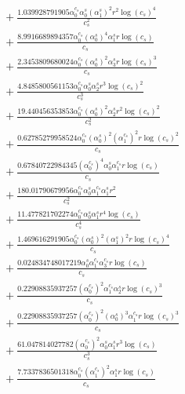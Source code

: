 \documentclass[10pt]{article}
\begin{document}
\begin{align*}
&{}  + \frac{1.039928791905 \alpha_{0}^{c_s} \alpha_{0}^s \left(\alpha_{1}^s\right)^{2} r^{2} \log{\left(c_{s} \right)}^{4}}{c_{s}^{2}} \\
&{}  + \frac{8.9916689894357 \alpha_{0}^{c_s} \left(\alpha_{0}^s\right)^{4} \alpha_{1}^s r \log{\left(c_{s} \right)}}{c_{s}} \\
&{}  + \frac{2.3453809680024 \alpha_{0}^{c_s} \left(\alpha_{0}^s\right)^{2} \alpha_{3}^s r \log{\left(c_{s} \right)}^{3}}{c_{s}} \\
&{}  + \frac{4.8485800561153 \alpha_{0}^{c_s} \alpha_{0}^s \alpha_{2}^s r^{3} \log{\left(c_{s} \right)}^{2}}{c_{s}^{3}} \\
&{}  + \frac{19.440456353853 \alpha_{0}^{c_s} \left(\alpha_{0}^s\right)^{2} \alpha_{2}^s r^{2} \log{\left(c_{s} \right)}^{2}}{c_{s}^{2}} \\
&{}  + \frac{0.62785279958524 \alpha_{0}^{c_s} \left(\alpha_{0}^s\right)^{2} \left(\alpha_{1}^{c_s}\right)^{2} r \log{\left(c_{s} \right)}^{2}}{c_{s}} \\
&{}  + \frac{0.67840722984345 \left(\alpha_{0}^{c_s}\right)^{4} \alpha_{0}^s \alpha_{1}^{c_s} r \log{\left(c_{s} \right)}}{c_{s}} \\
&{}  + \frac{180.01790679956 \alpha_{0}^{c_s} \alpha_{0}^s \alpha_{1}^{c_s} \alpha_{1}^s r^{2}}{c_{s}^{2}} \\
&{}  + \frac{11.477821702274 \alpha_{0}^{c_s} \alpha_{0}^s \alpha_{1}^s r^{4} \log{\left(c_{s} \right)}}{c_{s}^{4}} \\
&{}  + \frac{1.469616291905 \alpha_{0}^{c_s} \left(\alpha_{0}^s\right)^{2} \left(\alpha_{1}^s\right)^{2} r \log{\left(c_{s} \right)}^{4}}{c_{s}} \\
&{}  + \frac{0.024834748017219 \alpha_{0}^s \alpha_{1}^{c_s} \alpha_{3}^{c_s} r \log{\left(c_{s} \right)}}{c_{s}} \\
&{}  + \frac{0.22908835937257 \left(\alpha_{0}^{c_s}\right)^{2} \alpha_{1}^{c_s} \alpha_{2}^s r \log{\left(c_{s} \right)}^{3}}{c_{s}} \\
&{}  + \frac{0.22908835937257 \left(\alpha_{0}^{c_s}\right)^{2} \left(\alpha_{0}^s\right)^{3} \alpha_{1}^{c_s} r \log{\left(c_{s} \right)}^{3}}{c_{s}} \\
&{}  + \frac{61.047814027782 \left(\alpha_{0}^{c_s}\right)^{2} \alpha_{0}^s \alpha_{1}^s r^{3} \log{\left(c_{s} \right)}}{c_{s}^{3}} \\
&{}  + \frac{7.7337836501318 \alpha_{0}^{c_s} \left(\alpha_{1}^{c_s}\right)^{2} \alpha_{1}^s r \log{\left(c_{s} \right)}}{c_{s}} \\

\end{align*}
\end{document}
